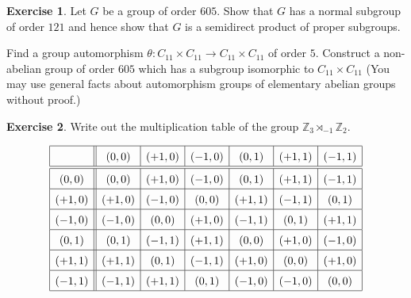 \documentclass{amsart}
\newcommand{\xra}{\xrightarrow}
\renewcommand{\:}{\colon}
\newcommand{\Z}{\mathbb{Z}}
\newcommand{\tht}       {\theta}
\theoremstyle{definition}
\newtheorem{exercise}{Exercise}
\newenvironment{solution}{{\noindent\bf Solution:}}{}
\begin{document}
\begin{exercise}
 Let $G$ be a group of order $605$.  Show that $G$ has a normal
 subgroup of order $121$ and hence show that $G$ is a semidirect
 product of proper subgroups.

 Find a group automorphism
 $\tht\:C_{11}\times C_{11}\xra{} C_{11}\times C_{11}$
 of order $5$.  Construct a non-abelian group of order $605$ which has
 a subgroup isomorphic to $C_{11} \times C_{11}$ (You may use general
 facts about automorphism groups of elementary abelian groups without
 proof.)
\end{exercise}
\begin{solution}

\end{solution}

\begin{exercise}
 Write out the multiplication table of the group $\Z_3\rtimes_{-1}\Z_2$.
\end{exercise}
\begin{solution}
 \[ \renewcommand{\arraystretch}{1.5}
  \begin{array}{|c||c|c|c|c|c|c|}\hline
         & ( 0,0) & (+1,0) & (-1,0) & ( 0,1) & (+1,1) & (-1,1) \\
  \hline\hline
  ( 0,0) & ( 0,0) & (+1,0) & (-1,0) & ( 0,1) & (+1,1) & (-1,1) \\ \hline
  (+1,0) & (+1,0) & (-1,0) & ( 0,0) & (+1,1) & (-1,1) & ( 0,1) \\ \hline
  (-1,0) & (-1,0) & ( 0,0) & (+1,0) & (-1,1) & ( 0,1) & (+1,1) \\ \hline
  ( 0,1) & ( 0,1) & (-1,1) & (+1,1) & ( 0,0) & (+1,0) & (-1,0) \\ \hline
  (+1,1) & (+1,1) & ( 0,1) & (-1,1) & (+1,0) & ( 0,0) & (+1,0) \\ \hline
  (-1,1) & (-1,1) & (+1,1) & ( 0,1) & (-1,0) & (-1,0) & ( 0,0) \\ \hline
 \end{array} \]
\end{solution}
\end{document}
